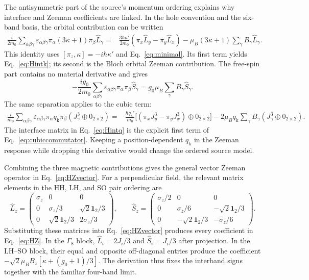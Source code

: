 \documentclass[10pt,letterpaper]{article}
\newcommand{\qq}{q_{\mathrm k}}
\newcommand{\one}{\mathbf 1}
\begin{document}
The antisymmetric part of the source's momentum ordering explains why interface and Zeeman coefficients are linked. In the hole convention and the six-band basis, the orbital contribution can be written
\begin{align}
\frac{i}{2m_0}\sum_{\alpha\beta\gamma}
\varepsilon_{\alpha\beta\gamma}
\pi_\alpha(3\kappa+1)\pi_\beta\hat L_\gamma
={}&\frac{3\hbar\kappa'}{2m_0}
(\pi_x\hat L_y-\pi_y\hat L_x)
-\mu_B(3\kappa+1)\sum_\gamma B_\gamma\hat L_\gamma.
\label{eq:orbitalcommutator}
\end{align}
This identity uses $[\pi_z,\kappa]=-i\hbar\kappa'$ and Eq.~\eqref{eq:minimal}. Its first term yields Eq.~\eqref{eq:Hintk}; its second is the Bloch orbital Zeeman contribution. The free-spin part contains no material derivative and gives
\begin{equation}
-\frac{ig_0}{2m_0}\sum_{\alpha\beta\gamma}
\varepsilon_{\alpha\beta\gamma}\pi_\alpha\pi_\beta\hat S_\gamma
=g_0\mu_B\sum_\gamma B_\gamma\hat S_\gamma.
\label{eq:spincommutator}
\end{equation}
The same separation applies to the cubic term:
\begin{align}
\frac{i}{m_0}\sum_{\alpha\beta\gamma}
\varepsilon_{\alpha\beta\gamma}\pi_\alpha\qq\pi_\beta
(J_\gamma^3\oplus0_{2\times2})
={}&\frac{\hbar\qq'}{m_0}
\bigl[(\pi_xJ_y^3-\pi_yJ_x^3)\oplus0_{2\times2}\bigr]
-2\mu_B\qq\sum_\gamma B_\gamma
(J_\gamma^3\oplus0_{2\times2}).
\label{eq:cubiccommutator}
\end{align}
The interface matrix in Eq.~\eqref{eq:Hintq} is the explicit first term of Eq.~\eqref{eq:cubiccommutator}. Keeping a position-dependent $\qq$ in the Zeeman response while dropping this derivative would change the ordered source model.

Combining the three magnetic contributions gives the general vector Zeeman operator in Eq.~\eqref{eq:HZvector}. For a perpendicular field, the relevant matrix elements in the HH, LH, and SO pair ordering are
\begin{equation}
\hat L_z=
\begin{pmatrix}
\sigma_z&0&0\\
0&\sigma_z/3&\sqrt2\one_2/3\\
0&\sqrt2\one_2/3&2\sigma_z/3
\end{pmatrix},
\qquad
\hat S_z=
\begin{pmatrix}
\sigma_z/2&0&0\\
0&\sigma_z/6&-\sqrt2\one_2/3\\
0&-\sqrt2\one_2/3&-\sigma_z/6
\end{pmatrix}.
\label{eq:LSz}
\end{equation}
Substituting these matrices into Eq.~\eqref{eq:HZvector} produces every coefficient in Eq.~\eqref{eq:HZ}. In the $\Gamma_8$ block, $\hat L_i=2J_i/3$ and $\hat S_i=J_i/3$ after projection. In the LH--SO block, their equal and opposite off-diagonal entries produce the coefficient $-\sqrt2\mu_BB_z[\kappa+(g_0+1)/3]$. The derivation thus fixes the interband signs together with the familiar four-band limit.
\end{document}
